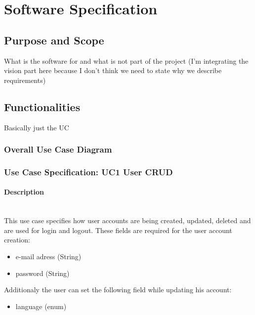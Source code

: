 \newpage
\section{Software Specification}
\label{sec:domainB}

\subsection{Purpose and Scope}
\label{sec:domainBa}
What is the software for and what is not part of the project (I'm integrating the vision part here because I don't think we need to state why we describe requirements)

\subsection{Functionalities}
\label{sec:domainBb}
Basically just the \ac{UC}

\subsubsection{Overall Use Case Diagram}
\label{sec:domainBba}


\newpage
\subsubsection{Use Case Specification: \ac{UC}1 User CRUD}
\label{sec:domainBbb}

\paragraph*{Description}\mbox{}\\
This use case specifies how user accounts are being created, updated, deleted and are used for login and logout.
These fields are required for the user account creation:

\begin{itemize}
	\vspace{-3mm}
	\setlength\itemsep{-1em}
	\item e-mail adress (String)
	\item password (String)
\end{itemize}
Additionaly the user can set the following field while updating his account:
\begin{itemize}
	\vspace{-3mm}
	\setlength\itemsep{-1em}
	\item language (enum)
\end{itemize}

